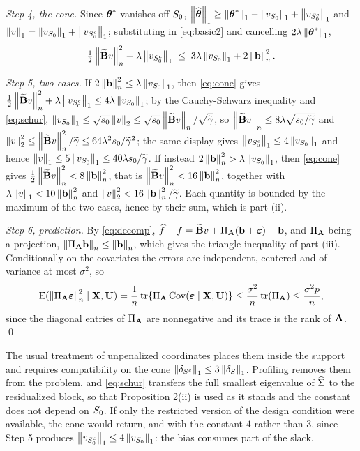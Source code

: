 \emph{Step 4, the cone.} Since $\thetastar$ vanishes off $\Szero$,
$\norm{\thetahat}_1 \ge \norm{\thetastar}_1 - \norm{v_{\Szero}}_1 +
\norm{v_{\Szero^c}}_1$ and
$\norm{v}_1 = \norm{v_{\Szero}}_1+\norm{v_{\Szero^c}}_1$; substituting in
\eqref{eq:basic2} and cancelling $2\pen\norm{\thetastar}_1$,
\begin{equation}
  \label{eq:cone}
  \tfrac12\normn{\Btil v}^2 + \pen\norm{v_{\Szero^c}}_1
  \;\le\; 3\pen\norm{v_{\Szero}}_1 + 2\normn{\bb}^2 .
\end{equation}

\emph{Step 5, two cases.} If $2\normn{\bb}^2 \le \pen\norm{v_{\Szero}}_1$,
then \eqref{eq:cone} gives
$\tfrac12\normn{\Btil v}^2 + \pen\norm{v_{\Szero^c}}_1 \le
4\pen\norm{v_{\Szero}}_1$; by the Cauchy-Schwarz inequality and
\eqref{eq:schur}, $\norm{v_{\Szero}}_1 \le \sqrt{s_0}\norm{v}_2 \le
\sqrt{s_0}\normn{\Btil v}/\sqrt{\gtil}$, so
$\normn{\Btil v} \le 8\pen\sqrt{s_0/\gtil}$ and
$\norm{v}_2^2 \le \normn{\Btil v}^2/\gtil \le 64\pen^2s_0/\gtil^2$; the same
display gives $\norm{v_{\Szero^c}}_1 \le 4\norm{v_{\Szero}}_1$ and hence
$\norm{v}_1 \le 5\norm{v_{\Szero}}_1 \le 40\pen s_0/\gtil$. If instead
$2\normn{\bb}^2 > \pen\norm{v_{\Szero}}_1$, then \eqref{eq:cone} gives
$\tfrac12\normn{\Btil v}^2 < 8\normn{\bb}^2$, that is
$\normn{\Btil v}^2 < 16\normn{\bb}^2$, together with
$\pen\norm{v}_1 < 10\normn{\bb}^2$ and
$\norm{v}_2^2 < 16\normn{\bb}^2/\gtil$. Each quantity is bounded by the
maximum of the two cases, hence by their sum, which is part (ii).

\emph{Step 6, prediction.} By \eqref{eq:decomp},
$\widehat{f}-f = \Btil v + \PA(\bb+\bveps) - \bb$, and $\PA$ being a
projection, $\normn{\PA\bb} \le \normn{\bb}$, which gives the triangle
inequality of part (iii). Conditionally on the covariates the errors are
independent, centered and of variance at most $\sigma^2$, so
\[
  \E(\normn{\PA\bveps}^2\mid\bX,\bU)
  = \frac1n\tr\{\PA\,\mathrm{Cov}(\bveps\mid\bX,\bU)\}
  \le \frac{\sigma^2}{n}\tr(\PA) \le \frac{\sigma^2p}{n},
\]
since the diagonal entries of $\PA$ are nonnegative and its trace is the rank
of $\Amat$. \qed

\begin{remark}
\label{rem:nocone}
The usual treatment of unpenalized coordinates \citep[Section
6.9]{buhlmann2011statistics} places them inside the support and requires
compatibility on the cone $\norm{\delta_{S^c}}_1 \le 3\norm{\delta_S}_1$.
Profiling removes them from the problem, and \eqref{eq:schur} transfers the
full smallest eigenvalue of $\Gramhat$ to the residualized block, so that
Proposition 2(ii) is used as it stands and the constant does not depend on
$\Szero$. If only the restricted version of the design condition were
available, the cone would return, and with the constant $4$ rather than $3$,
since Step 5 produces $\norm{v_{\Szero^c}}_1 \le 4\norm{v_{\Szero}}_1$: the
bias consumes part of the slack.
\end{remark}

